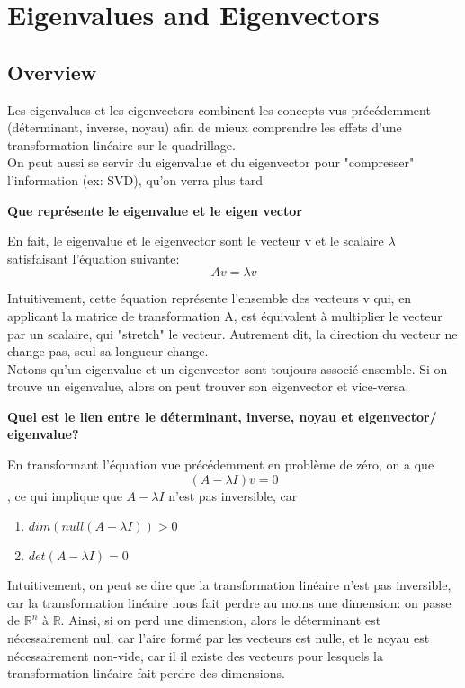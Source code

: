 \documentclass{article}
\begin{document}
\section{Eigenvalues and Eigenvectors}

\subsection{Overview}%
\label{sub:Overview}

Les eigenvalues et les eigenvectors combinent les concepts vus précédemment
(déterminant, inverse, noyau) afin de mieux comprendre les effets d'une
transformation linéaire sur le quadrillage.\\

On peut aussi se servir du eigenvalue et du eigenvector pour "compresser"
l'information (ex: SVD), qu'on verra plus tard

\textbf{Que représente le eigenvalue et le eigen vector}

En fait, le eigenvalue et le eigenvector sont le vecteur v et le scalaire
$\lambda$ satisfaisant l'équation suivante:
$$ Av = \lambda v $$

Intuitivement, cette équation représente l'ensemble des vecteurs v qui,
en applicant la matrice de transformation A, est équivalent à multiplier le
vecteur par un scalaire, qui "stretch" le vecteur. Autrement dit, la direction
du vecteur ne change pas, seul sa longueur change.\\

Notons qu'un eigenvalue et un eigenvector sont toujours associé ensemble. Si
on trouve un eigenvalue, alors on peut trouver son eigenvector et vice-versa.

\textbf{Quel est le lien entre le déterminant, inverse, noyau et eigenvector/
eigenvalue?}

En transformant l'équation vue précédemment en problème de zéro, on a que
$$ (A- \lambda I)v = 0 $$, ce qui implique que $ A - \lambda I $
n'est pas inversible, car
\begin{enumerate}
    \item $ dim(null(A-\lambda I)) > 0 $
    \item $ det(A -\lambda I) = 0 $
\end{enumerate}

Intuitivement, on peut se dire que la transformation linéaire n'est pas
inversible, car la transformation linéaire nous fait perdre au moins une
dimension: on passe de $\mathbb{R}^n$ à $\mathbb{R}$. Ainsi, si on perd une
dimension, alors le déterminant est nécessairement nul, car l'aire formé par
les vecteurs est nulle, et le noyau est nécessairement non-vide, car il
il existe des vecteurs pour lesquels la transformation linéaire fait perdre
des dimensions.
\end{document}
